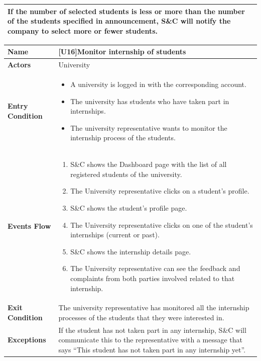 \begin{center}
\begin{tabular}{|p{9em}|p{27em}|}
         If the number of selected students is less or more than the number of the students specified in announcement, S\&C will notify the company to 
         select more or fewer students.\\
        \hline
    \end{tabular}
\end{center}

\begin{center}
    \begin{tabular}{|p{9em}|p{27em}|}
        \hline
        \rowcolor{bluepoli!40} %
        \textbf{Name} & \textbf{[U16]Monitor internship of students} \\
        \hline
        \textbf{Actors} & University \\
        \hline
        \textbf{Entry Condition} & 
        \begin{itemize}
            \item A university is logged in with the corresponding account.
            \item The university has students who have taken part in internships.
            \item The university representative wants to monitor the internship process of the students.
        \end{itemize} \\
        \hline
        \textbf{Events Flow} & 
        \begin{enumerate}
            \item S\&C shows the Dashboard page with the list of all registered students of the university.
            \item The University representative clicks on a student's profile.
            \item S\&C shows the student's profile page.
            \item The University representative clicks on one of the student's internships (current or past).
            \item S\&C shows the internship details page.
            \item The University representative can see the feedback and complaints from both parties involved related to that internship.
        \end{enumerate} \\
        \hline
        \textbf{Exit Condition} & The university representative has monitored all the internship processes of the students that they were
        interested in. \\
        \hline
        \textbf{Exceptions} & If the student has not taken part in any internship, S\&C will communicate this to the representative with a 
        message that says ``This student has not taken part in any internship yet''. \\
        \hline
    \end{tabular}
\end{center}


